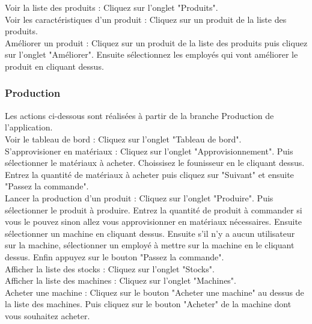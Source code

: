 Voir la liste des produits : Cliquez sur l'onglet "Produits". \\

Voir les caractéristiques d'un produit : Cliquez sur un produit de la liste des produits. \\

Améliorer un produit : Cliquez sur un produit de la liste des produits puis cliquez sur l'onglet "Améliorer". Ensuite sélectionnez les employés qui vont améliorer le produit en cliquant dessus. \\



\subsubsection*{Production}



Les actions ci-dessous sont réalisées à partir de la branche Production de l'application.\\

Voir le tableau de bord : Cliquez sur l'onglet "Tableau de bord". \\

S'approvisioner en matériaux : Cliquez sur l'onglet "Approvisionnement". Puis sélectionner le matériaux à acheter. Choissisez le founisseur en le cliquant dessus. Entrez la quantité de matériaux à acheter puis cliquez sur "Suivant" et ensuite "Passez la commande". \\

Lancer la production d'un produit : Cliquez sur l'onglet "Produire". Puis sélectionner le produit à produire. Entrez la quantité de produit à commander si vous le pouvez sinon allez vous approvisionner en matériaux nécessaires. Ensuite sélectionner un machine en cliquant dessus. Ensuite s'il n'y a aucun utilisateur sur la machine, sélectionner un employé à mettre sur la machine en le cliquant dessus. Enfin appuyez sur le bouton "Passez la commande". \\

Afficher la liste des stocks : Cliquez sur l'onglet "Stocks". \\

Afficher la liste des machines : Cliquez sur l'onglet "Machines". \\

Acheter une machine : Cliquez sur le bouton "Acheter une machine" au dessus de la liste des machines. Puis cliquez sur le bouton "Acheter" de la machine dont vous souhaitez acheter. \\

